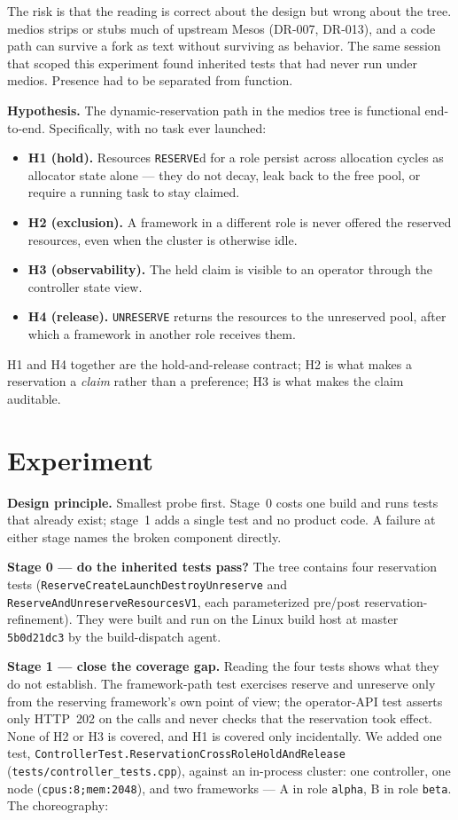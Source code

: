 \documentclass[11pt]{article}
\newcommand{\code}[1]{\texttt{#1}}
\begin{document}
The risk is that the reading is correct about the design but wrong about the
tree. medios strips or stubs much of upstream Mesos (DR-007, DR-013), and a
code path can survive a fork as text without surviving as behavior. The same
session that scoped this experiment found inherited tests that had never run
under medios. Presence had to be separated from function.

\textbf{Hypothesis.} The dynamic-reservation path in the medios tree is
functional end-to-end. Specifically, with no task ever launched:

\begin{itemize}
\item \textbf{H1 (hold).} Resources \code{RESERVE}d for a role persist
  across allocation cycles as allocator state alone --- they do not decay,
  leak back to the free pool, or require a running task to stay claimed.
\item \textbf{H2 (exclusion).} A framework in a different role is never
  offered the reserved resources, even when the cluster is otherwise idle.
\item \textbf{H3 (observability).} The held claim is visible to an operator
  through the controller state view.
\item \textbf{H4 (release).} \code{UNRESERVE} returns the resources to the
  unreserved pool, after which a framework in another role receives them.
\end{itemize}

H1 and H4 together are the hold-and-release contract; H2 is what makes a
reservation a \emph{claim} rather than a preference; H3 is what makes the
claim auditable.

\section{Experiment}

\textbf{Design principle.} Smallest probe first. Stage~0 costs one build and
runs tests that already exist; stage~1 adds a single test and no product
code. A failure at either stage names the broken component directly.

\textbf{Stage 0 --- do the inherited tests pass?} The tree contains four
reservation tests (\code{ReserveCreateLaunchDestroyUnreserve} and
\code{ReserveAndUnreserveResourcesV1}, each parameterized pre/post
reservation-refinement). They were built and run on the Linux build host at
master \code{5b0d21dc3} by the build-dispatch agent.

\textbf{Stage 1 --- close the coverage gap.} Reading the four tests shows
what they do not establish. The framework-path test exercises reserve and
unreserve only from the reserving framework's own point of view; the
operator-API test asserts only HTTP~202 on the calls and never checks that
the reservation took effect. None of H2 or H3 is covered, and H1 is covered
only incidentally. We added one test,
\code{ControllerTest.ReservationCrossRoleHoldAndRelease}
(\code{tests/controller\_tests.cpp}), against an in-process cluster: one
controller, one node (\code{cpus:8;mem:2048}), and two frameworks --- A in
role \code{alpha}, B in role \code{beta}. The choreography:
\end{document}
